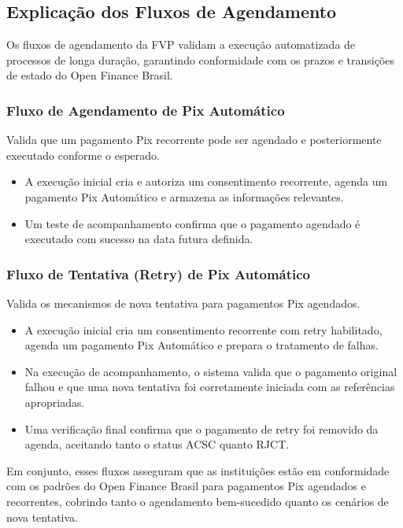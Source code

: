 \subsection{Explicação dos Fluxos de Agendamento}

Os fluxos de agendamento da FVP validam a execução automatizada de processos de longa duração, garantindo conformidade com os prazos e transições de estado do Open Finance Brasil.

\subsubsection{Fluxo de Agendamento de Pix Automático}
Valida que um pagamento Pix recorrente pode ser agendado e posteriormente executado conforme o esperado.

\begin{itemize}
    \item A execução inicial cria e autoriza um consentimento recorrente, agenda um pagamento Pix Automático e armazena as informações relevantes.
    \item Um teste de acompanhamento confirma que o pagamento agendado é executado com sucesso na data futura definida.
\end{itemize}

\subsubsection{Fluxo de Tentativa (Retry) de Pix Automático}
Valida os mecanismos de nova tentativa para pagamentos Pix agendados.
\begin{itemize}
    \item A execução inicial cria um consentimento recorrente com retry habilitado, agenda um pagamento Pix Automático e prepara o tratamento de falhas.
    \item Na execução de acompanhamento, o sistema valida que o pagamento original falhou e que uma nova tentativa foi corretamente iniciada com as referências apropriadas.
    \item Uma verificação final confirma que o pagamento de retry foi removido da agenda, aceitando tanto o status ACSC quanto RJCT.
\end{itemize}
Em conjunto, esses fluxos asseguram que as instituições estão em conformidade com os padrões do Open Finance Brasil para pagamentos Pix agendados e recorrentes, cobrindo tanto o agendamento bem-sucedido quanto os cenários de nova tentativa.
